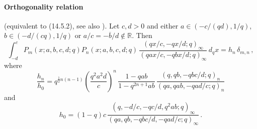 \documentclass[twoside,11pt]{article}
\newcommand\RR{\mathbb{R}}
\newcommand\de\delta
\newcommand\half{\frac12}
\newcommand\iy\infty
\begin{document}
\paragraph{Orthogonality relation}
(equivalent to (14.5.2), see also \cite[(2.42), (2.41), (2.36), (2.35)]{K17}).
Let $c,d>0$ and either $a\in (-c/(qd),1/q)$, $b\in(-d/(cq),1/q)$ or
$a/c=-\overline b/d\notin\RR$. Then
\begin{equation}
\int_{-d}^c P_m(x;a,b,c,d;q) P_n(x;a,b,c,d;q)\,
\frac{(qx/c,-qx/d;q)_\iy}{(qax/c,-qbx/d;q)_\iy}\,d_qx=h_n\,\de_{m,n}\,,
\label{124}
\end{equation}
where
\begin{equation}
\frac{h_n}{h_0}=q^{\half n(n-1)}\left(\frac{q^2a^2d}c\right)^n\,
\frac{1-qab}{1-q^{2n+1}ab}\,
\frac{(q,qb,-qbc/d;q)_n}{(qa,qab,-qad/c;q)_n}
\label{125}
\end{equation}
and
\begin{equation}
h_0=(1-q)c\,\frac{(q,-d/c,-qc/d,q^2ab;q)_\iy}
{(qa,qb,-qbc/d,-qad/c;q)_\iy}\,.
\label{126}
\end{equation}
%
\end{document}
